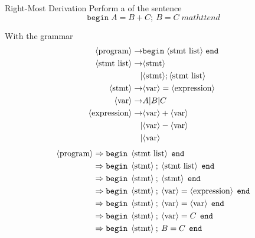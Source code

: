 \begin{example}[]{Right-Most Derivation}
  Perform a  of the sentence
  \begin{equation*}
    \mathtt{begin} \; A = B + C ; \: B = C \; mathtt{end}
  \end{equation*}

  With the grammar
  \begin{align*}
    \langle \text{program} \rangle \rightarrow &\mathtt{begin} \; \langle \text{stmt list} \rangle \; \mathtt{end} \\
    \langle \text{stmt list} \rangle \rightarrow &\langle \text{stmt} \rangle \\
                          \vert &\langle \text{stmt} \rangle ; \langle \text{stmt list} \rangle \\
    \langle \text{stmt} \rangle \rightarrow &\langle \text{var} \rangle = \langle \text{expression} \rangle \\
    \langle \text{var} \rangle \rightarrow &A \vert B \vert C \\
    \langle \text{expression} \rangle \rightarrow &\langle \text{var} \rangle + \langle \text{var} \rangle \\
                          \vert &\langle \text{var} \rangle - \langle \text{var} \rangle \\
                          \vert &\langle \text{var} \rangle
  \end{align*}
  \tcblower{}
  \begin{align*}
    \Nonterminal{program} &\Rightarrow \mathtt{begin} \:\: \Nonterminal{stmt list} \:\: \mathtt{end} \\
                          &\Rightarrow \mathtt{begin} \:\: \Nonterminal{stmt}\: ; \: \Nonterminal{stmt list} \:\: \mathtt{end} \\
                          &\Rightarrow \mathtt{begin} \:\: \Nonterminal{stmt} \: ; \: \Nonterminal{stmt} \:\: \mathtt{end} \\
                          &\Rightarrow \mathtt{begin} \:\: \Nonterminal{stmt} \: ; \: \Nonterminal{var} = \Nonterminal{expression} \:\: \mathtt{end} \\
                          &\Rightarrow \mathtt{begin} \:\: \Nonterminal{stmt} \: ; \: \Nonterminal{var} = \Nonterminal{var} \:\: \mathtt{end} \\
                          &\Rightarrow \mathtt{begin} \:\: \Nonterminal{stmt} \: ; \: \Nonterminal{var} = C \:\: \mathtt{end} \\
                          &\Rightarrow \mathtt{begin} \:\: \Nonterminal{stmt} \: ; \: B = C \:\: \mathtt{end} \\

\end{align*}
\end{example}
